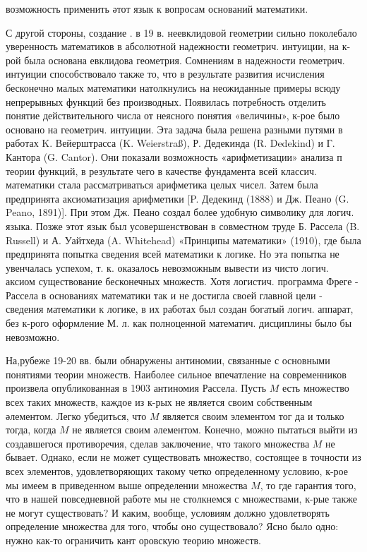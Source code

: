 \documentclass[10pt]{article}
\begin{document}
возможность применить әтот язык к вопросам оснований математики.



С другой стороны, создание . в 19 в. неевклидовой геометрии сильно поколебало уверенность математиков в абсолютной надежности геометрич. интуиции, на к-рой была основана евклидова геометрия. Сомнениям в надежности геометрич. интуиции способствовало также то, что в результате развития исчисления бесконечно малых математики натолкнулись на неожиданные примеры всюду непрерывных функций без производных. Появилась потребность отделить понятие действительного числа от неясного понятия «величины», к-рое было основано на геометрич. интуиции. Эта задача была решена разными путями в работах $\mathrm{K}$. Вейерштрасса (K. Weierstraß), Р. Дедекинда (R. Dedekind) и Г. Кантора (G. Cantor). Они показали возможность «арифметизации» анализа п теории функций, в результате чего в качестве фундамента всей классич. математики стала рассматриваться арифметика целых чисел. Затем была предпринята аксиоматизация арифметики [P. Дедекинд (1888) и Дж. Пеано (G. Peano, 1891)]. При этом Дж. Пеано создал более удобную символику для логич. языка. Позже этот язык был усовершенствован в совместном труде Б. Рассела (B. Russell) и А. Уайтхеда (A. Whitehead) «Принципы математики» (1910), где была предпринята попытка сведения всей математики к логике. Но эта попытка не увенчалась успехом, т. к. оказалось невозможным вывести из чисто логич. аксиом существование бесконечных множеств. Хотя логистич. программа Фреге - Рассела в основаниях математики так и не достигла своей главной цели - сведения математики к логике, в их работах был создан богатый логич. аппарат, без к-рого оформление М. л. как полноценной математич. дисциплины было бы невозможно.



На,рубеже 19-20 вв. были обнаружены антиномии, связанные с основными понятиями теории множеств. Наиболее сильное впечатление на современников произвела опубликованная в 1903 антиномия Рассела. Пусть $M$ есть множество всех таких множеств, каждое из к-рых не является своим собственным әлементом. Легко убедиться, что $M$ является своим элементом тог да и только тогда, когда $M$ не является своим әлементом. Конечно, можно пытаться выйти из создавшегося противоречия, сделав заключение, что такого множества $M$ не бывает. Однако, если не может существовать множество, состоящее в точности из всех элементов, удовлетворяющих такому четко определенному условию, к-рое мы имеем в приведенном выше определении множества $M$, то где гарантия того, что в нашей повседневной работе мы не столкнемся с множествами, к-рые также не могут существовать? И каким, вообще, условиям должно удовлетворять определение множества для того, чтобы оно существовало? Ясно было одно: нужно как-то ограничить кант оровскую теорию множеств.
\end{document}
